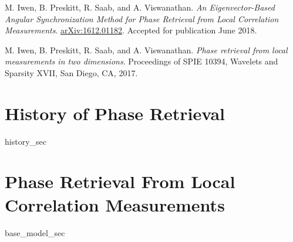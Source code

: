 \documentclass[12pt]{ucsd-thesis-2018}
\begin{document}
\begin{frontmatter}
\begin{vitapage}
\begin{publications}
\item  M. Iwen, B. Preskitt, R. Saab, and A. Viswanathan.  \emph{An Eigenvector-Based Angular Synchronization Method for Phase Retrieval from Local Correlation Measurements}.  \href{https://arxiv.org/abs/1612.01182}{arXiv:1612.01182}.  Accepted for publication June 2018.
  \item M. Iwen, B. Preskitt, R. Saab, and A. Viswanathan.  \emph{Phase retrieval from local measurements in two dimensions}.  Proceedings of SPIE 10394, Wavelets and Sparsity XVII, San Diego, CA, 2017.
\end{publications}

\end{vitapage}

\begin{abstract}
  

\end{abstract}

\end{frontmatter}

\chapter{History of Phase Retrieval}
{history_sec}

\chapter{Phase Retrieval From Local Correlation Measurements}
\label{ch:our_model}
\label{ch:base_model}
{base_model_sec}
\end{document}
